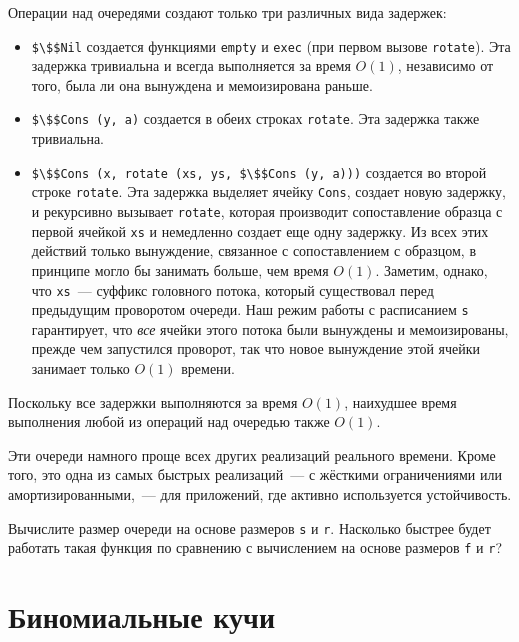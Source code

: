 Операции над очередями создают только три различных вида задержек:
\begin{itemize}
\item \lstinline!$\$$Nil! создается функциями \lstinline!empty! и
  \lstinline!exec! (при первом вызове \lstinline!rotate!). Эта
  задержка тривиальна и всегда выполняется за время $O(1)$, независимо
  от того, была ли она вынуждена и мемоизирована раньше.
\item \lstinline!$\$$Cons (y, a)! создается в обеих строках
  \lstinline!rotate!. Эта задержка также тривиальна.
\item \lstinline!$\$$Cons (x, rotate (xs, ys, $\$$Cons (y, a)))!
  создается во второй строке \lstinline!rotate!. Эта задержка выделяет
  ячейку \lstinline!Cons!, создает новую задержку, и рекурсивно
  вызывает \lstinline!rotate!, которая производит сопоставление
  образца с первой ячейкой \lstinline!xs! и немедленно создает еще
  одну задержку. Из всех этих действий только вынуждение, связанное с
  сопоставлением с образцом, в принципе могло бы занимать больше, чем
  время $O(1)$. Заметим, однако, что \lstinline!xs!~--- суффикс
  головного потока, который существовал перед предыдущим проворотом
  очереди. Наш режим работы с расписанием \lstinline!s! гарантирует,
  что \emph{все} ячейки этого потока были вынуждены и мемоизированы,
  прежде чем запустился проворот, так что новое вынуждение этой ячейки
  занимает только $O(1)$ времени.
\end{itemize}
Поскольку все задержки выполняются за время $O(1)$, наихудшее время
выполнения любой из операций над очередью также $O(1)$.

\begin{hint}
  Эти очереди намного проще всех других реализаций реального
  времени. Кроме того, это одна из самых быстрых реализаций~--- с
  жёсткими ограничениями или амортизированными,~--- для приложений,
  где активно используется устойчивость.
\end{hint}

\begin{exercise}\label{ex:7.2}
  Вычислите размер очереди на основе размеров \lstinline!s! и
  \lstinline!r!. Насколько быстрее будет работать такая функция по
  сравнению с вычислением на основе размеров \lstinline!f! и
  \lstinline!r!? 
\end{exercise}

\section{Биномиальные кучи}
\label{sc:7.3}

